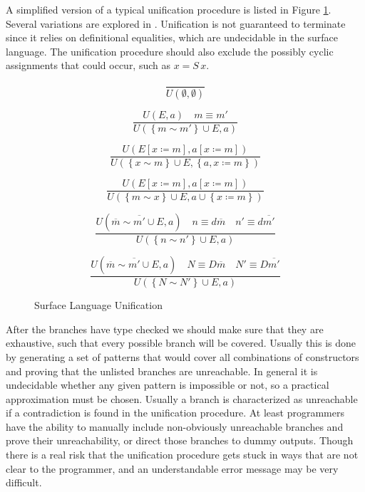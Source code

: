 A simplified version of a typical unification procedure is listed in Figure \ref{fig:surface-data-unification}.
Several variations are explored in \cite{cockx_devriese_2018}.
Unification is not guaranteed to terminate since it relies on definitional equalities, which are undecidable in the surface language.
The unification procedure should also exclude the possibly cyclic assignments that could occur, such as $x=S\,x$. 

\begin{figure}
\[
\frac{\,}{U\left(\emptyset,\emptyset\right)}
\]

\[
\frac{U\left(E,a\right)\quad m\equiv m'}{U\left(\left\{ m\sim m'\right\} \cup E,a\right)}
\]

\[
\frac{U\left(E\left[x\coloneqq m\right],a\left[x\coloneqq m\right]\right)}{U\left(\left\{ x\sim m\right\} \cup E,\left\{ a,x\coloneqq m\right\} \right)}
\]

\[
\frac{U\left(E\left[x\coloneqq m\right],a\left[x\coloneqq m\right]\right)}{U\left(\left\{ m\sim x\right\} \cup E,a\cup\left\{ x\coloneqq m\right\} \right)}
\]

\[
\frac{U\left(\overline{m}\sim\overline{m'}\cup E,a\right)\quad n\equiv d\overline{m}\quad n'\equiv d\overline{m'}}{U\left(\left\{ n\sim n'\right\} \cup E,a\right)}
\]

\[
\frac{U\left(\overline{m}\sim\overline{m'}\cup E,a\right)\quad N\equiv D\overline{m}\quad N'\equiv D\overline{m'}}{U\left(\left\{ N\sim N'\right\} \cup E,a\right)}
\]

\caption{Surface Language Unification}
\label{fig:surface-data-unification}
\end{figure}

After the branches have type checked we should make sure that they are exhaustive, such that every possible branch will be covered.
Usually this is done by generating a set of patterns that would cover all combinations of constructors and proving that the unlisted branches are unreachable.
In general it is undecidable whether any given pattern is impossible or not, so a practical approximation must be chosen.
Usually a branch is characterized as unreachable if a contradiction is found in the unification procedure.
At least programmers have the ability to manually include non-obviously unreachable branches and prove their unreachability, or direct those branches to dummy outputs.
Though there is a real risk that the unification procedure gets stuck in ways that are not clear to the programmer, and an understandable error message may be very difficult.

